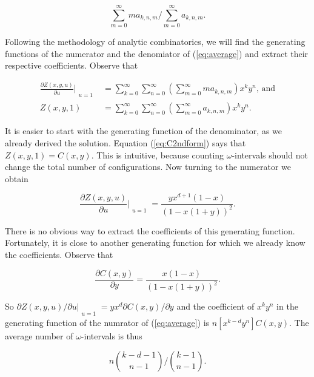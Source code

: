 \documentclass{article}
\begin{document}
\begin{equation}
\label{eq:average}
\sum_{m=0}^\infty ma_{k,n,m}\Big/\sum_{m=0}^\infty a_{k,n,m}.
\end{equation}

Following the methodology of analytic combinatorics, we will find the
generating functions of the numerator and the denomiator of
(\ref{eq:average}) and extract their respective coefficients. Observe that

\begin{equation*}
\begin{split}
\frac{\partial Z(x,y,u)}{\partial u}\Bigr|_{\substack{\\u=1}} &=
\sum_{k=0}^\infty\sum_{n=0}^\infty
\left(\sum_{m=0}^\infty ma_{k,n,m}\right) x^ky^n \text{, and} \\
Z(x,y,1) &= \sum_{k=0}^\infty\sum_{n=0}^\infty
\left(\sum_{m=0}^\infty a_{k,n,m} \right)x^ky^n.
\end{split}
\end{equation*}

It is easier to start with the generating function of the denominator, as
we already derived the solution. Equation (\ref{eq:C2ndform}) says that
$Z(x,y,1) = C(x,y)$. This is intuitive, because counting
$\omega$-intervals should not change the total number of configurations.
Now turning to the numerator we obtain

\begin{equation*}
\frac{\partial Z(x,y,u)}{\partial u}\Bigr|_{\substack{\\u=1}}
= \frac{yx^{d+1}(1-x)}{\left(1-x(1+y)\right)^2}.
\end{equation*}

There is no obvious way to extract the coefficients of this generating
function. Fortunately, it is close to another generating function for
which we already know the coefficients. Observe that

\begin{equation*}
\frac{\partial C(x,y)}{\partial y} = 
\frac{x(1-x)}{\left(1-x(1+y)\right)^2}.
\end{equation*}

So $\partial Z(x,y,u)/\partial u|_{\substack{\\u=1}} = yx^d\partial
C(x,y)/\partial y$ and the coefficient of $x^ky^n$ in the generating
function of the numrator of (\ref{eq:average}) is $n[x^{k-d}y^n]C(x,y)$.
The average number of $\omega$-intervals is thus

\begin{equation*}
n {k-d-1 \choose n-1} \Big/ {k-1 \choose n-1}.
\end{equation*}
\end{document}
